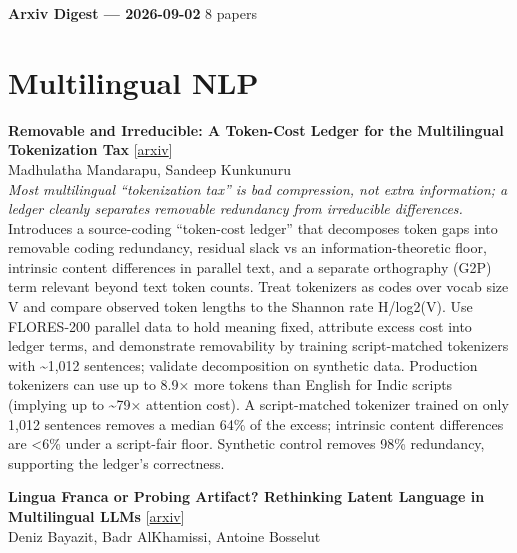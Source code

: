 \documentclass[12pt,letterpaper]{article}
\begin{document}
{\footnotesize\textbf{Arxiv Digest --- 2026-09-02} \hfill 8 papers}

\smallskip

\section*{Multilingual NLP}

{\small\textbf{Removable and Irreducible: A Token-Cost Ledger for the Multilingual Tokenization Tax}} {\scriptsize[\href{https://arxiv.org/abs/2609.00378}{arxiv}]}\\
{\scriptsize Madhulatha Mandarapu, Sandeep Kunkunuru}\\

{\small\textit{Most multilingual ``tokenization tax'' is bad compression, not extra information; a ledger cleanly separates removable redundancy from irreducible differences.}}\\[1pt]
{\footnotesize Introduces a source-coding ``token-cost ledger'' that decomposes token gaps into removable coding redundancy, residual slack vs an information-theoretic floor, intrinsic content differences in parallel text, and a separate orthography (G2P) term relevant beyond text token counts. Treat tokenizers as codes over vocab size V and compare observed token lengths to the Shannon rate H/log2(V). Use FLORES-200 parallel data to hold meaning fixed, attribute excess cost into ledger terms, and demonstrate removability by training script-matched tokenizers with \textasciitilde{}1,012 sentences; validate decomposition on synthetic data. Production tokenizers can use up to 8.9× more tokens than English for Indic scripts (implying up to \textasciitilde{}79× attention cost). A script-matched tokenizer trained on only 1,012 sentences removes a median 64\% of the excess; intrinsic content differences are <6\% under a script-fair floor. Synthetic control removes 98\% redundancy, supporting the ledger's correctness.}

\medskip

{\small\textbf{Lingua Franca or Probing Artifact? Rethinking Latent Language in Multilingual LLMs}} {\scriptsize[\href{https://arxiv.org/abs/2609.00155}{arxiv}]}\\
{\scriptsize Deniz Bayazit, Badr AlKhamissi, Antoine Bosselut}\\
\end{document}
